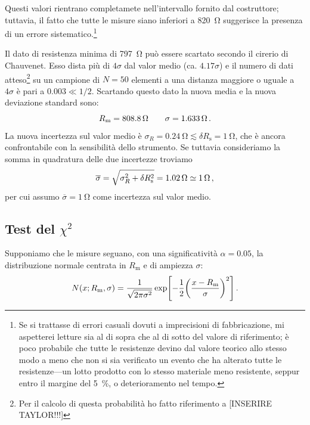             Questi valori rientrano completamete nell'intervallo fornito dal costruttore; tuttavia, il fatto che tutte le misure siano inferiori a \SI{820}{\ohm} suggerisce la presenza di un errore sistematico.\footnote{Se si trattasse di errori casuali dovuti a imprecisioni di fabbricazione, mi aspetterei letture sia al di sopra che al di sotto del valore di riferimento; è poco probabile che tutte le resistenze devino dal valore teorico allo stesso modo a meno che non si sia verificato un evento che ha alterato tutte le resistenze---un lotto prodotto con lo stesso materiale meno resistente, seppur entro il margine del \SI{5}{\%}, o deterioramento nel tempo.}

            Il dato di resistenza minima di \SI{797}{\ohm} può essere scartato secondo il cirerio di Chauvenet. Esso dista più di $4\sigma$ dal valor medio (ca. $\num{4.17}\sigma$) e il numero di dati atteso\footnote{Per il calcolo di questa probabilità ho fatto riferimento a [INSERIRE TAYLOR!!!]} su un campione di $N = 50$ elementi a una distanza maggiore o uguale a $4\sigma$ è pari a $\num{0.003} \ll 1/2$. Scartando questo dato la nuova media e la nuova deviazione standard sono:
            \begin{equation*}
                R_\text{m} = \SI{808.8}{\ohm}
                \qquad
                \sigma = \SI{1.633}{\ohm}
                \,.
            \end{equation*}
            La nuova incertezza sul valor medio è $\sigma_R = \SI{0.24}{\ohm} \lesssim \delta R_\text{s} = \SI{1}{\ohm}$, che è ancora confrontabile con la sensibilità dello strumento. Se tuttavia consideriamo la somma in quadratura delle due incertezze troviamo
            \begin{equation*}
                \overline{\sigma}
                = \sqrt{\sigma_R^2 + \delta R_\text{s}^2}
                = \SI{1.02}{\ohm}
                \simeq \SI{1}{\ohm}
                \,,
            \end{equation*}
            per cui assumo $\overline{\sigma} = \SI{1}{\ohm}$ come incertezza sul valor medio.

        \subsection{Test del $\chi^2$}
            Supponiamo che le misure seguano, con una significatività $\alpha = \num{0.05}$, la distribuzione normale centrata in $R_\text{m}$ e di ampiezza $\sigma$:
            \begin{equation*}
                N\pqty{x; R_\text{m}, \sigma}
                = \frac{1}{\sqrt{2\pi\sigma^2}} \exp[ -\frac{1}{2}\pqty{\frac{x - R_\text{m}}{\sigma}}^2]
                \myperiod
            \end{equation*}
            

